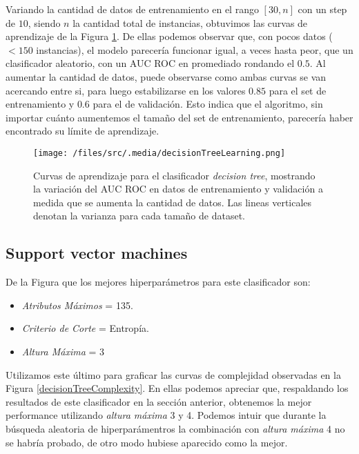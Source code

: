 
Variando la cantidad de datos de entrenamiento en el rango $[30, n]$ con un step de $10$, siendo $n$ la cantidad total de instancias, obtuvimos las curvas de aprendizaje de la Figura \ref{decisionTreeLearning}. De ellas podemos observar que, con pocos datos ($< 150$ instancias), el modelo parecería funcionar igual, a veces hasta peor, que un clasificador aleatorio, con un AUC ROC en promediado rondando el $0.5$. Al aumentar la cantidad de datos, puede observarse como ambas curvas se van acercando entre si, para luego estabilizarse en los valores $0.85$ para el set de entrenamiento y $0.6$ para el de validación. Esto indica que el algoritmo, sin importar cuánto aumentemos el tamaño del set de entrenamiento, parecería haber encontrado su límite de aprendizaje.

\begin{figure}[!htbp]
    \centering
    \texttt{[image: /files/src/.media/decisionTreeLearning.png]}
    \caption{Curvas de aprendizaje para el clasificador \textit{decision tree}, mostrando la variación del AUC ROC en datos de entrenamiento y validación a medida que se aumenta la cantidad de datos. Las lineas verticales denotan la varianza para cada tamaño de dataset.}
    \label{decisionTreeLearning}
\end{figure}


\subsection{Support vector machines}
De la Figura  que los mejores hiperparámetros para este clasificador son:

\begin{itemize}
    \item \textit{Atributos Máximos} = 135.
    \item \textit{Criterio de Corte} = Entropía.
    \item \textit{Altura Máxima} = 3
\end{itemize}

Utilizamos este último para graficar las curvas de complejidad observadas en la Figura \ref{decisionTreeComplexity}. En ellas podemos apreciar que, respaldando los resultados de este clasificador en la sección anterior, obtenemos la mejor performance utilizando \textit{altura máxima} 3 y 4. Podemos intuir que durante la búsqueda aleatoria de hiperparámentros la combinación con \textit{altura máxima} 4 no se habría probado, de otro modo hubiese aparecido como la mejor.  

